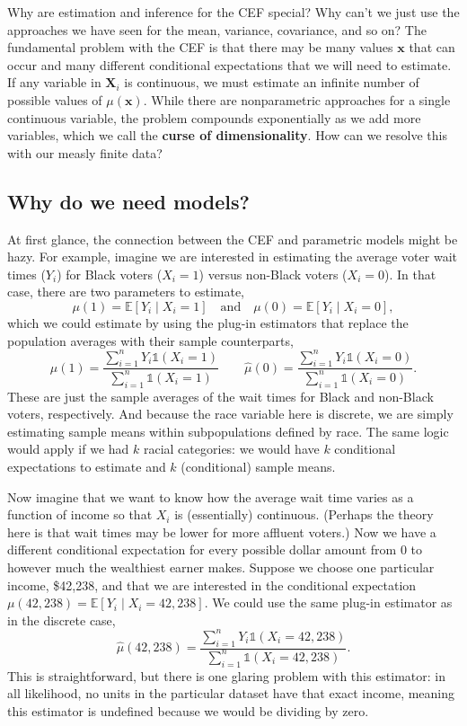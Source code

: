 \documentclass[
  13pt,
  letterpaper,
  DIV=11,
  numbers=noendperiod]{scrreprt}
\newcommand{\mb}{\bm}
\newcommand{\E}{\mathbb{E}}
\newcommand{\X}{\mb{X}}
\newcommand{\bfx}{\mb{x}}
\theoremstyle{plain}
\theoremstyle{plain}
\theoremstyle{definition}
\theoremstyle{definition}
\theoremstyle{remark}
\begin{document}
Why are estimation and inference for the CEF special? Why can't we just
use the approaches we have seen for the mean, variance, covariance, and
so on? The fundamental problem with the CEF is that there may be many
values \(\bfx\) that can occur and many different conditional
expectations that we will need to estimate. If any variable in \(\X_i\)
is continuous, we must estimate an infinite number of possible values of
\(\mu(\bfx)\). While there are nonparametric approaches for a single
continuous variable, the problem compounds exponentially as we add more
variables, which we call the \textbf{curse of dimensionality}. How can
we resolve this with our measly finite data?

\subsection{Why do we need models?}\label{why-do-we-need-models}

At first glance, the connection between the CEF and parametric models
might be hazy. For example, imagine we are interested in estimating the
average voter wait times (\(Y_i\)) for Black voters (\(X_i = 1\)) versus
non-Black voters (\(X_i=0\)). In that case, there are two parameters to
estimate, \[
\mu(1) = \E[Y_i \mid X_i = 1] \quad \text{and}\quad \mu(0) = \E[Y_i \mid X_i = 0],
\] which we could estimate by using the plug-in estimators that replace
the population averages with their sample counterparts, \[ 
\widehat{\mu}(1) = \frac{\sum_{i=1}^{n} Y_{i}\mathbb{1}(X_{i} = 1)}{\sum_{i=1}^{n}\mathbb{1}(X_{i} = 1)} \qquad \widehat{\mu}(0) = \frac{\sum_{i=1}^{n} Y_{i}\mathbb{1}(X_{i} = 0)}{\sum_{i=1}^{n}\mathbb{1}(X_{i} = 0)}.
\] These are just the sample averages of the wait times for Black and
non-Black voters, respectively. And because the race variable here is
discrete, we are simply estimating sample means within subpopulations
defined by race. The same logic would apply if we had \(k\) racial
categories: we would have \(k\) conditional expectations to estimate and
\(k\) (conditional) sample means.

Now imagine that we want to know how the average wait time varies as a
function of income so that \(X_i\) is (essentially) continuous. (Perhaps
the theory here is that wait times may be lower for more affluent
voters.) Now we have a different conditional expectation for every
possible dollar amount from 0 to however much the wealthiest earner
makes. Suppose we choose one particular income, \$42,238, and that we
are interested in the conditional expectation
\(\mu(42{,}238)= \E[Y_{i}\mid X_{i} = 42{,}238]\). We could use the same
plug-in estimator as in the discrete case, \[
\widehat{\mu}(42{,}238) = \frac{\sum_{i=1}^{n} Y_{i}\mathbb{1}(X_{i} = 42{,}238)}{\sum_{i=1}^{n}\mathbb{1}(X_{i} = 42{,}238)}.
\] This is straightforward, but there is one glaring problem with this
estimator: in all likelihood, no units in the particular dataset have
that exact income, meaning this estimator is undefined because we would
be dividing by zero.
\end{document}
